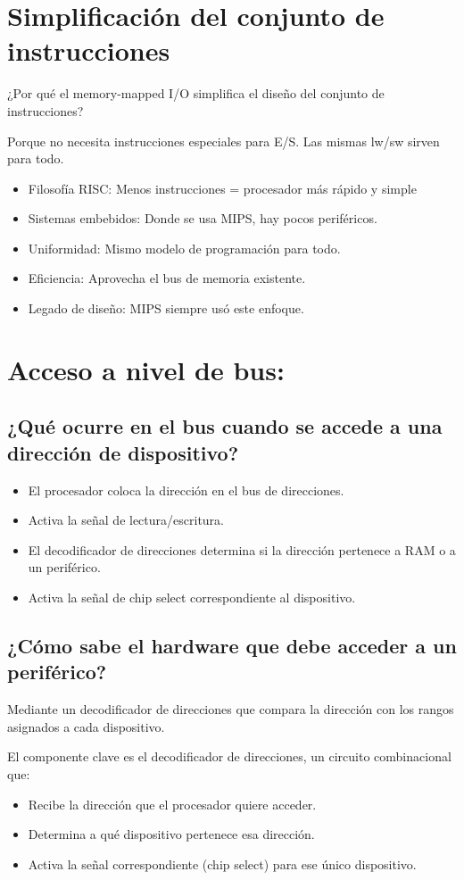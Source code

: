 \documentclass{article}
\begin{document}
\section{Simplificación del conjunto de instrucciones}
¿Por qué el memory-mapped I/O simplifica el diseño del conjunto de instrucciones?

Porque no necesita instrucciones especiales para E/S. Las mismas lw/sw sirven para todo.
\begin{itemize}
    \item Filosofía RISC: Menos instrucciones = procesador más rápido y simple
    \item Sistemas embebidos: Donde se usa MIPS, hay pocos periféricos.
    \item Uniformidad: Mismo modelo de programación para todo.
    \item Eficiencia: Aprovecha el bus de memoria existente.
    \item Legado de diseño: MIPS siempre usó este enfoque.
\end{itemize}
\section{Acceso a nivel de bus:}
\subsection{¿Qué ocurre en el bus cuando se accede a una dirección de dispositivo?}
\begin{itemize}
    \item El procesador coloca la dirección en el bus de direcciones.
    \item Activa la señal de lectura/escritura.
    \item El decodificador de direcciones determina si la dirección pertenece a RAM o a un periférico.
    \item Activa la señal de chip select correspondiente al dispositivo.
\end{itemize}
\subsection{¿Cómo sabe el hardware que debe acceder a un periférico?}
Mediante un decodificador de direcciones que compara la dirección con los rangos asignados a cada dispositivo.

El componente clave es el decodificador de direcciones, un circuito combinacional que:
\begin{itemize}
    \item Recibe la dirección que el procesador quiere acceder.
    \item Determina a qué dispositivo pertenece esa dirección.
    \item Activa la señal correspondiente (chip select) para ese único dispositivo.
\end{itemize}
\end{document}
